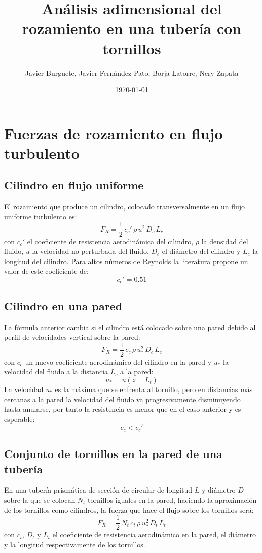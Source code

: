 \documentclass[a4paper]{article}
\author{Javier Burguete, Javier Fernández-Pato, Borja Latorre, Nery Zapata}
\date{\today}
\title{Análisis adimensional del rozamiento en una tubería con tornillos}
\newcommand{\EQ}[2]{\begin{equation}#1\label{#2}\end{equation}}
\begin{document}
\section{Fuerzas de rozamiento en flujo turbulento}

\subsection{Cilindro en flujo uniforme}

El rozamiento que produce un cilindro, colocado transversalmente en un flujo
uniforme turbulento es:
\EQ{F_R=\frac12\,c_c'\,\rho\,u^2\,D_c\,L_c}{EqFrCilindroUniforme}
con $c_c'$ el coeficiente de resistencia aerodinámica del cilindro, $\rho$ la
densidad del fluido, $u$ la velocidad no perturbada del fluido, $D_c$ el
diámetro del cilindro y $L_c$ la longitud del cilindro. Para altos números de
Reynolds la literatura propone un valor de este coeficiente de:
\EQ{c_c'=0.51}{EqCc}

\subsection{Cilindro en una pared}

La fórmula anterior cambia si el cilindro está colocado sobre una pared debido
al perfil de velocidades vertical sobre la pared:
\EQ{F_R=\frac12\,c_c\,\rho\,u_*^2\,D_c\,L_c}{EqFrCilindroPared}
con $c_c$ un nuevo coeficiente aerodinámico del cilindro en la pared y $u_*$ la
velocidad del fluido a la distancia $L_c$ a la pared:
\EQ{u_*=u\left(z=L_t\right)}{EqUAsterisco}
La velocidad $u_*$ es la máxima que se enfrenta al tornillo, pero en distancias
más cercanas a la pared la velocidad del fluido va progresivamente disminuyendo
hasta anularse, por tanto la resistencia es menor que en el caso anterior y es
esperable:
\EQ{c_c<c_c'}{EqCcII}

\subsection{Conjunto de tornillos en la pared de una tubería}

En una tubería prismática de sección de circular de longitud $L$ y diámetro $D$
sobre la que se colocan $N_t$ tornillos iguales en la pared, haciendo la
aproximación de los tornillos como cilindros, la fuerza que hace el flujo
sobre los tornillos será:
\EQ{F_R=\frac12\,N_t\,c_t\,\rho\,u_*^2\,D_t\,L_t}{EqFrTornillos}
con $c_t$, $D_t$ y $L_t$ el coeficiente de resistencia aerodinámico en la pared,
el diámetro y la longitud respectivamente de los tornillos.
\end{document}
